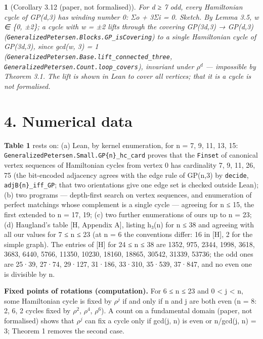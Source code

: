 \documentclass[11pt,a4paper]{article}
\theoremstyle{named}
\newtheorem*{namedthm}{}
\begin{document}
\begin{namedthm}[Corollary 3.12 (paper, not formalised)]
For d ≥ 7 odd, every Hamiltonian cycle of GP(d,3) has winding number 0: Σo + 3Σi = 0. \textit{Sketch.} By Lemma 3.5, w ∈ \{0, ±2\}; a cycle with w = ±2 lifts through the covering GP(3d,3) → GP(d,3) (\texttt{GeneralizedPetersen.\allowbreak{}Blocks.\allowbreak{}GP\_\allowbreak{}isCovering}) to a single Hamiltonian cycle of GP(3d,3), since gcd(w, 3) = 1 (\texttt{GeneralizedPetersen.\allowbreak{}Base.\allowbreak{}lift\_\allowbreak{}connected\_\allowbreak{}three}, \texttt{GeneralizedPetersen.\allowbreak{}Count.\allowbreak{}loop\_\allowbreak{}covers}), invariant under $ρ^d$ — impossible by Theorem 3.1. The lift is shown in Lean to cover all vertices; that it is a cycle is not formalised.
\end{namedthm}

\section*{4. Numerical data}
\textbf{Table 1} rests on: (a) Lean, by kernel enumeration, for n = 7, 9, 11, 13, 15: \texttt{GeneralizedPetersen.\allowbreak{}Small.\allowbreak{}GP\{n\}\_\allowbreak{}hc\_\allowbreak{}card} proves that the \texttt{Finset} of canonical vertex sequences of Hamiltonian cycles from vertex 0 has cardinality 7, 9, 11, 26, 75 (the bit-encoded adjacency agrees with the edge rule of GP(n,3) by \texttt{decide}, \texttt{adjB\{n\}\_\allowbreak{}iff\_\allowbreak{}GP}; that two orientations give one edge set is checked outside Lean); (b) two programs — depth-first search on vertex sequences, and enumeration of perfect matchings whose complement is a single cycle — agreeing for n ≤ 15, the first extended to n = 17, 19; (c) two further enumerations of ours up to n = 23; (d) Haugland's table [H, Appendix A], listing h₃(n) for n ≤ 38 and agreeing with all our values for 7 ≤ n ≤ 23 (at n = 6 the conventions differ: 16 in [H], 2 for the simple graph). The entries of [H] for 24 ≤ n ≤ 38 are 1352, 975, 2344, 1998, 3618, 3683, 6440, 5766, 11350, 10230, 18160, 18865, 30542, 31339, 53736; the odd ones are 25·39, 27·74, 29·127, 31·186, 33·310, 35·539, 37·847, and no even one is divisible by n.

\textbf{Fixed points of rotations (computation).} For 6 ≤ n ≤ 23 and 0 \textless{} j \textless{} n, some Hamiltonian cycle is fixed by $ρ^j$ if and only if n and j are both even (n = 8: 2, 6, 2 cycles fixed by $ρ^2$, $ρ^4$, $ρ^6$). A count on a fundamental domain (paper, not formalised) shows that $ρ^j$ can fix a cycle only if gcd(j, n) is even or n/gcd(j, n) = 3; Theorem 1 removes the second case.
\end{document}
